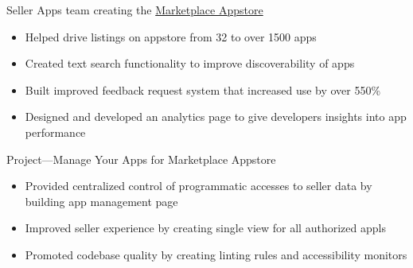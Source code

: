 \documentclass[11pt,letterpaper,ragged2e,withhyper]{altacv}
\begin{document}
\begin{paracol}{2}





\switchcolumn


\par Seller Apps team creating the \href{https://sellercentral.amazon.com/apps/store}{\color{accent} Marketplace Appstore}
\begin{itemize}
\item Helped drive listings on appstore from 32 to over 1500 apps
\item Created text search functionality to improve discoverability of apps
\item Built improved feedback request system that increased use by over 550\%
\item Designed and developed an analytics page to give developers insights into app performance
\end{itemize}


\divider

\par Project—Manage Your Apps for Marketplace Appstore
\begin{itemize}
\item Provided centralized control of programmatic accesses to seller data by building app management page
\item Improved seller experience by creating single view for all authorized appls
\item Promoted codebase quality by creating linting rules and accessibility monitors
\end{itemize}


\end{paracol}
\end{document}
